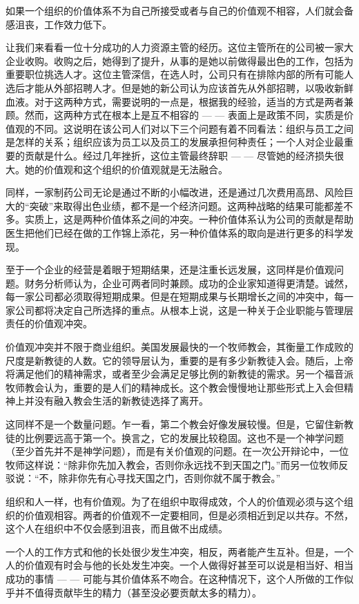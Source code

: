 \documentclass[a4paper,12pt,lang=cn,fontset = windows]{elegantpaper} %
\begin{document}
如果一个组织的价值体系不为自己所接受或者与自己的价值观不相容，人们就会备感沮丧，工作效力低下。

让我们来看看一位十分成功的人力资源主管的经历。这位主管所在的公司被一家大企业收购。收购之后，她得到了提升，从事的是她以前做得最出色的工作，包括为重要职位挑选人才。这位主管深信，在选人时，公司只有在排除内部的所有可能人选后才能从外部招聘人才。但是她的新公司认为应该首先从外部招聘，以吸收新鲜血液。对于这两种方式，需要说明的一点是，根据我的经验，适当的方式是两者兼顾。然而，这两种方式在根本上是互不相容的 — — 表面上是政策不同，实质是价值观的不同。这说明在该公司人们对以下三个问题有着不同看法：组织与员工之间是怎样的关系；组织应该为员工以及员工的发展承担何种责任；一个人对企业最重要的贡献是什么。经过几年挫折，这位主管最终辞职 — — 尽管她的经济损失很大。她的价值观和这个组织的价值观就是无法融合。

同样，一家制药公司无论是通过不断的小幅改进，还是通过几次费用高昂、风险巨大的“突破”来取得出色业绩，都不是一个经济问题。这两种战略的结果可能都差不多。实质上，这是两种价值体系之间的冲突。一种价值体系认为公司的贡献是帮助医生把他们已经在做的工作锦上添花，另一种价值体系的取向是进行更多的科学发现。

至于一个企业的经营是着眼于短期结果，还是注重长远发展，这同样是价值观问题。财务分析师认为，企业可两者同时兼顾。成功的企业家知道得更清楚。诚然，每一家公司都必须取得短期成果。但是在短期成果与长期增长之间的冲突中，每一家公司都将决定自己所选择的重点。从根本上说，这是一种关于企业职能与管理层责任的价值观冲突。

价值观冲突并不限于商业组织。美国发展最快的一个牧师教会，其衡量工作成败的尺度是新教徒的人数。它的领导层认为，重要的是有多少新教徒入会。随后，上帝将满足他们的精神需求，或者至少会满足足够比例的新教徒的需求。另一个福音派牧师教会认为，重要的是人们的精神成长。这个教会慢慢地让那些形式上入会但精神上并没有融入教会生活的新教徒选择了离开。

这同样不是一个数量问题。乍一看，第二个教会好像发展较慢。但是，它留住新教徒的比例要远高于第一个。换言之，它的发展比较稳固。这也不是一个神学问题（至少首先并不是神学问题），而是有关价值观的问题。在一次公开辩论中，一位牧师这样说：“除非你先加入教会，否则你永远找不到天国之门。”而另一位牧师反驳说：“不，除非你先有心寻找天国之门，否则你就不属于教会。”

组织和人一样，也有价值观。为了在组织中取得成效，个人的价值观必须与这个组织的价值观相容。两者的价值观不一定要相同，但是必须相近到足以共存。不然，这个人在组织中不仅会感到沮丧，而且做不出成绩。

一个人的工作方式和他的长处很少发生冲突，相反，两者能产生互补。但是，一个人的价值观有时会与他的长处发生冲突。一个人做得好甚至可以说是相当好、相当成功的事情 — — 可能与其价值体系不吻合。在这种情况下，这个人所做的工作似乎并不值得贡献毕生的精力（甚至没必要贡献太多的精力）。
\end{document}
